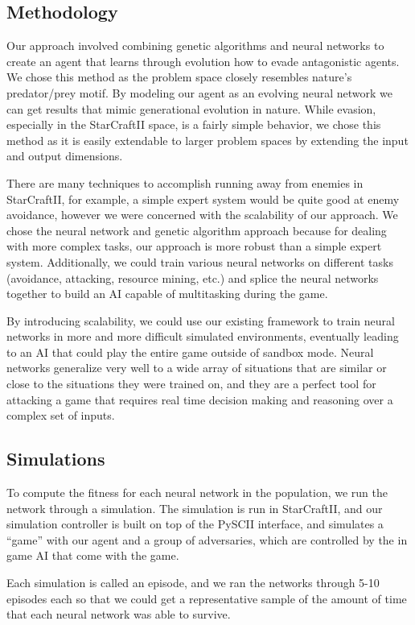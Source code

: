 \documentclass{article}
\begin{document}
\begin{multicols}{2}
\section{Methodology}
Our approach involved combining genetic algorithms and neural networks to
create an agent that learns through evolution how to evade antagonistic
agents. We chose this method as the problem space closely resembles nature's
predator/prey motif. By modeling our agent as an evolving neural network we can
get results that mimic generational evolution in nature. While evasion,
especially in the StarCraftII space, is a fairly simple behavior, we chose this
method as it is easily extendable to larger problem spaces by extending the
input and output dimensions.

There are many techniques to accomplish running away from enemies in
StarCraftII, for example, a simple expert system would be quite good at enemy
avoidance, however we were concerned with the scalability of our approach. We
chose the neural network and genetic algorithm approach because for dealing
with more complex tasks, our approach is more robust than a simple expert
system. Additionally, we could train various neural networks on different
tasks (avoidance, attacking, resource mining, etc.) and splice the neural
networks together to build an AI capable of multitasking during the game.

By introducing scalability, we could use our existing framework to train neural
networks in more and more difficult simulated environments, eventually leading
to an AI that could play the entire game outside of sandbox mode. Neural
networks generalize very well to a wide array of situations that are similar or
close to the situations they were trained on, and they are a perfect tool for
attacking a game that requires real time decision making and reasoning over a
complex set of inputs.

\subsection{Simulations}
To compute the fitness for each neural network in the population, we run the
network through a simulation. The simulation is run in StarCraftII, and our
simulation controller is built on top of the PySCII interface, and simulates
a ``game'' with our agent and a group of adversaries, which are controlled by
the in game AI that come with the game.

Each simulation is called an episode, and we ran the networks through 5-10
episodes each so that we could get a representative sample of the amount of time
that each neural network was able to survive.


\end{multicols}
\end{document}
